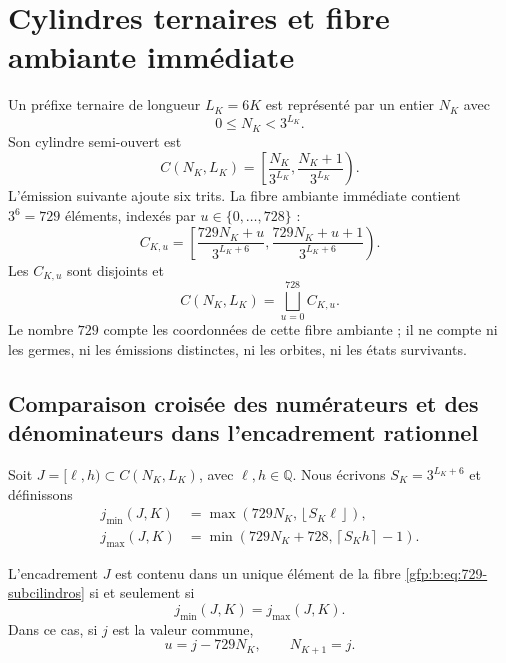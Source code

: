 \section{Cylindres ternaires et fibre ambiante immédiate}

Un préfixe ternaire de longueur \(L_K=6K\) est représenté par un entier
\(N_K\) avec
\[
 0\leq N_K<3^{L_K}.
\]
Son cylindre semi-ouvert est
\begin{equation}
 C(N_K,L_K)=
 \left[
 \frac{N_K}{3^{L_K}},
 \frac{N_K+1}{3^{L_K}}
 \right).
 \label{gfp:b:eq:cilindro-nivel-K}
\end{equation}
L’émission suivante ajoute six trits. La fibre ambiante immédiate contient
\(3^6=729\) éléments, indexés par \(u\in\{0,\ldots,728\}\) :
\begin{equation}
 C_{K,u}=
 \left[
 \frac{729N_K+u}{3^{L_K+6}},
 \frac{729N_K+u+1}{3^{L_K+6}}
 \right).
 \label{gfp:b:eq:729-subcilindros}
\end{equation}
Les \(C_{K,u}\) sont disjoints et
\[
 C(N_K,L_K)=\bigsqcup_{u=0}^{728}C_{K,u}.
\]
Le nombre \(729\) compte les coordonnées de cette fibre ambiante ; il ne compte
ni les germes, ni les émissions distinctes, ni les orbites, ni les états survivants.

\subsection{Comparaison croisée des numérateurs et des dénominateurs dans l’encadrement rationnel}

Soit \(J=[\ell,h)\subset C(N_K,L_K)\), avec
\(\ell,h\in\mathbb Q\). Nous écrivons \(S_K=3^{L_K+6}\) et définissons
\begin{align}
 j_{\min}(J,K)
 &=\max\!\left(729N_K,\left\lfloor S_K\ell\right\rfloor\right),
 \label{gfp:b:eq:jmin-diagonal}\\
 j_{\max}(J,K)
 &=\min\!\left(729N_K+728,\left\lceil S_Kh\right\rceil-1\right).
 \label{gfp:b:eq:jmax-diagonal}
\end{align}

\begin{lemma}
\label{gfp:b:lem:criterio-localizacion-unitaria}
L’encadrement \(J\) est contenu dans un unique élément de la fibre
\eqref{gfp:b:eq:729-subcilindros} si et seulement si
\begin{equation}
 \boxed{j_{\min}(J,K)=j_{\max}(J,K).}
 \label{gfp:b:eq:jmin-igual-jmax}
\end{equation}
Dans ce cas, si \(j\) est la valeur commune,
\[
 u=j-729N_K,
 \qquad
 N_{K+1}=j.
\]
\end{lemma}


